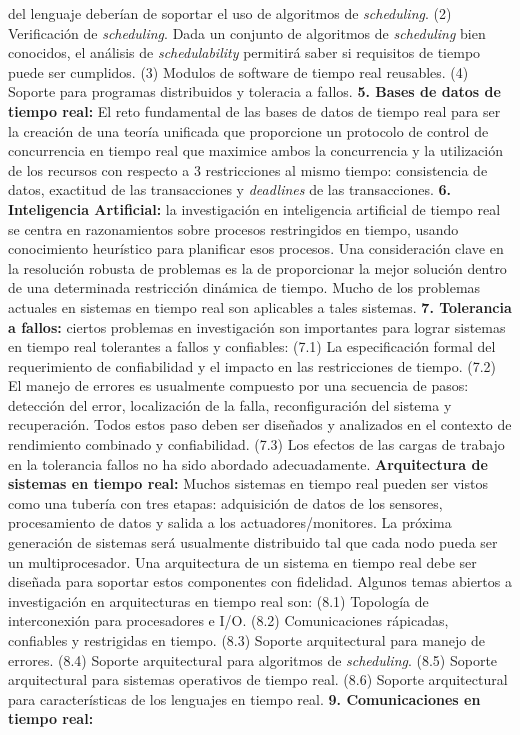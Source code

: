 del lenguaje deberían de soportar el uso de algoritmos de \emph{scheduling}. (2) Verificación de \emph{scheduling}. Dada un conjunto de algoritmos de \emph{scheduling} bien conocidos, el análisis de \emph{schedulability} permitirá saber si requisitos de tiempo puede ser cumplidos. (3) Modulos de software de tiempo real reusables. (4) Soporte para programas distribuidos y toleracia a fallos. \textbf{5. Bases de datos de tiempo real:} El reto fundamental de las bases de datos de tiempo real para ser la creación de una teoría unificada que proporcione un protocolo de control de concurrencia en tiempo real que maximice ambos la concurrencia y la utilización de los recursos con respecto a 3 restricciones al mismo tiempo: consistencia de datos, exactitud de las transacciones y \emph{deadlines} de las transacciones. \textbf{6. Inteligencia Artificial:} la investigación en inteligencia artificial de tiempo real se centra en razonamientos sobre procesos restringidos en tiempo, usando conocimiento heurístico para planificar esos procesos. Una consideración clave en la resolución robusta de problemas es la de  proporcionar la mejor solución dentro de una determinada restricción dinámica de tiempo. Mucho de los problemas actuales en sistemas en tiempo real son aplicables a tales sistemas. \textbf{7. Tolerancia a fallos:} ciertos problemas en investigación son importantes para lograr sistemas en tiempo real tolerantes a fallos y confiables: (7.1) La especificación formal del requerimiento de confiabilidad y el impacto en las restricciones de tiempo. (7.2) El manejo de errores es usualmente compuesto por una secuencia de pasos: detección del error, localización de la falla, reconfiguración del sistema y recuperación. Todos estos paso deben ser diseñados y analizados en el contexto de rendimiento combinado y confiabilidad. (7.3) Los efectos de las cargas de trabajo en la tolerancia fallos no ha sido abordado adecuadamente. \textbf{Arquitectura de sistemas en tiempo real:} Muchos sistemas en tiempo real pueden ser vistos como una tubería con tres etapas: adquisición de datos de los sensores, procesamiento de datos y salida a los actuadores/monitores. La próxima generación de sistemas será usualmente distribuido tal que cada nodo pueda ser un multiprocesador. Una arquitectura de un sistema en tiempo real debe ser diseñada para soportar estos componentes con fidelidad. Algunos temas abiertos a investigación en arquitecturas en tiempo real son: (8.1) Topología de interconexión para procesadores e I/O. (8.2) Comunicaciones rápicadas, confiables y restrigidas en tiempo. (8.3) Soporte arquitectural para manejo de errores. (8.4) Soporte arquitectural para algoritmos de \emph{scheduling}. (8.5) Soporte arquitectural para sistemas operativos de tiempo real. (8.6) Soporte arquitectural para características de los lenguajes en tiempo real. \textbf{9. Comunicaciones en tiempo real:} 
 


